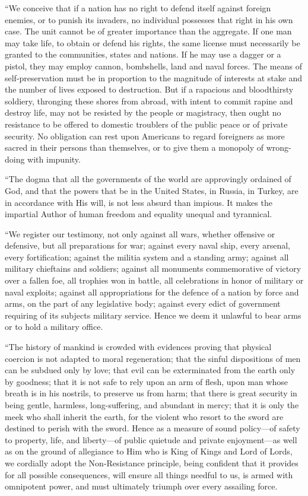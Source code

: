 \documentclass{book}
\begin{document}
“We conceive that if a nation has no right to defend itself against foreign enemies, or to punish its invaders, no individual possesses that right in his own case. The unit cannot be of greater importance than the aggregate. If one man may take life, to obtain or defend his rights, the same license must necessarily be granted to the communities, states and nations. If he may use a dagger or a pistol, they may employ cannon, bombshells, land and naval forces. The means of self-preservation must be in proportion to the magnitude of interests at stake and the number of lives exposed to destruction. But if a rapacious and bloodthirsty soldiery, thronging these shores from abroad, with intent to commit rapine and destroy life, may not be resisted by the people or magistracy, then ought no resistance to be offered to domestic troublers of the public peace or of private security. No obligation can rest upon Americans to regard foreigners as more sacred in their persons than themselves, or to give them a monopoly of wrong-doing with impunity.

“The dogma that all the governments of the world are approvingly ordained of God, and that the powers that be in the United States, in Russia, in Turkey, are in accordance with His will, is not less absurd than impious. It makes the impartial Author of human freedom and equality unequal and tyrannical.

“We register our testimony, not only against all wars, whether offensive or defensive, but all preparations for war; against every naval ship, every arsenal, every fortification; against the militia system and a standing army; against all military chieftains and soldiers; against all monuments commemorative of victory over a fallen foe, all trophies won in battle, all celebrations in honor of military or naval exploits; against all appropriations for the defence of a nation by force and arms, on the part of any legislative body; against every edict of government requiring of its subjects military service. Hence we deem it unlawful to bear arms or to hold a military office.

“The history of mankind is crowded with evidences proving that physical coercion is not adapted to moral regeneration; that the sinful dispositions of men can be subdued only by love; that evil can be exterminated from the earth only by goodness; that it is not safe to rely upon an arm of flesh, upon man whose breath is in his nostrils, to preserve us from harm; that there is great security in being gentle, harmless, long-suffering, and abundant in mercy; that it is only the meek who shall inherit the earth, for the violent who resort to the sword are destined to perish with the sword. Hence as a measure of sound policy—of safety to property, life, and liberty—of public quietude and private enjoyment—as well as on the ground of allegiance to Him who is King of Kings and Lord of Lords, we cordially adopt the Non-Resistance principle, being confident that it provides for all possible consequences, will ensure all things needful to us, is armed with omnipotent power, and must ultimately triumph over every assailing force.
\end{document}

